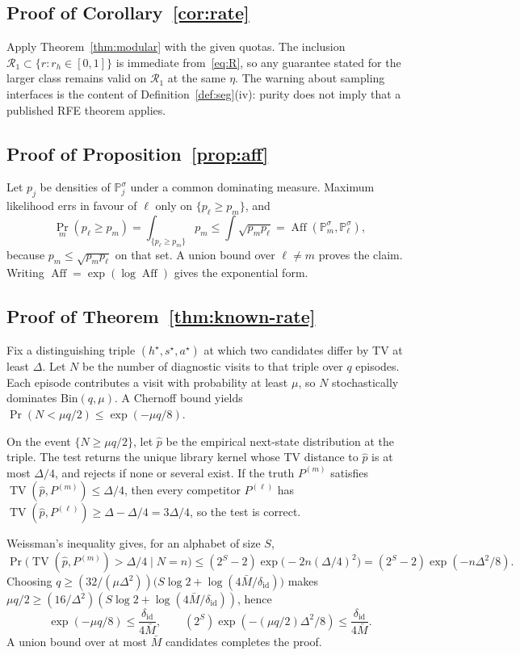 \documentclass[11pt]{article}
\newcommand{\Rone}{\mathcal{R}_1}
\newcommand{\Aff}{\operatorname{Aff}}
\newcommand{\TV}{\operatorname{TV}}
\newcommand{\Prb}{\Pr}
\newcommand{\deltaid}{\delta_{\mathrm{id}}}
\begin{document}
\subsection{Proof of Corollary~\ref{cor:rate}}
Apply Theorem~\ref{thm:modular} with the given quotas. The inclusion
$\Rone\subset\{r:r_h\in[0,1]\}$ is immediate from~\eqref{eq:R}, so any
guarantee stated for the larger class remains valid on $\Rone$ at the same
$\eta$. The warning about sampling interfaces is the content of
Definition~\ref{def:seg}(iv): purity does not imply that a published RFE
theorem applies.

\subsection{Proof of Proposition~\ref{prop:aff}}
Let $p_j$ be densities of $\mathbb{P}_j^\sigma$ under a common dominating
measure. Maximum likelihood errs in favour of $\ell$ only on
$\{p_\ell\ge p_m\}$, and
\[
\Prb_m(p_\ell\ge p_m)
=\int_{\{p_\ell\ge p_m\}} p_m
\le \int \sqrt{p_m p_\ell}
=\Aff(\mathbb{P}_m^\sigma,\mathbb{P}_\ell^\sigma),
\]
because $p_m\le\sqrt{p_m p_\ell}$ on that set. A union bound over
$\ell\neq m$ proves the claim. Writing $\Aff=\exp(\log\Aff)$ gives the
exponential form.

\subsection{Proof of Theorem~\ref{thm:known-rate}}
Fix a distinguishing triple $(h^\star,s^\star,a^\star)$ at which two
candidates differ by TV at least $\Delta$. Let $N$ be the number of
diagnostic visits to that triple over $q$ episodes. Each episode contributes
a visit with probability at least $\mu$, so $N$ stochastically dominates
$\mathrm{Bin}(q,\mu)$. A Chernoff bound yields
$\Prb(N<\mu q/2)\le\exp(-\mu q/8)$.

On the event $\{N\ge \mu q/2\}$, let $\widehat p$ be the empirical next-state
distribution at the triple. The test returns the unique library kernel whose
TV distance to $\widehat p$ is at most $\Delta/4$, and rejects if none or
several exist. If the truth $P^{(m)}$ satisfies $\TV(\widehat p,P^{(m)})\le\Delta/4$,
then every competitor $P^{(\ell)}$ has
$\TV(\widehat p,P^{(\ell)})\ge\Delta-\Delta/4=3\Delta/4$, so the test is
correct.

Weissman's inequality \citep{weissman2003inequalities} gives, for an alphabet
of size $S$,
\[
\Prb\bigl(\TV(\widehat p,P^{(m)})>\Delta/4\mid N=n\bigr)
\le (2^S-2)\exp\bigl(-2n(\Delta/4)^2\bigr)
=(2^S-2)\exp(-n\Delta^2/8).
\]
Choosing
$q\ge (32/(\mu\Delta^2))\bigl(S\log 2+\log(4\bar M/\deltaid)\bigr)$
makes $\mu q/2\ge (16/\Delta^2)(S\log 2+\log(4\bar M/\deltaid))$, hence
\[
\exp(-\mu q/8)\le \frac{\deltaid}{4\bar M},
\qquad
(2^S)\exp(-(\mu q/2)\Delta^2/8)\le\frac{\deltaid}{4\bar M}.
\]
A union bound over at most $\bar M$ candidates completes the proof.
\end{document}
